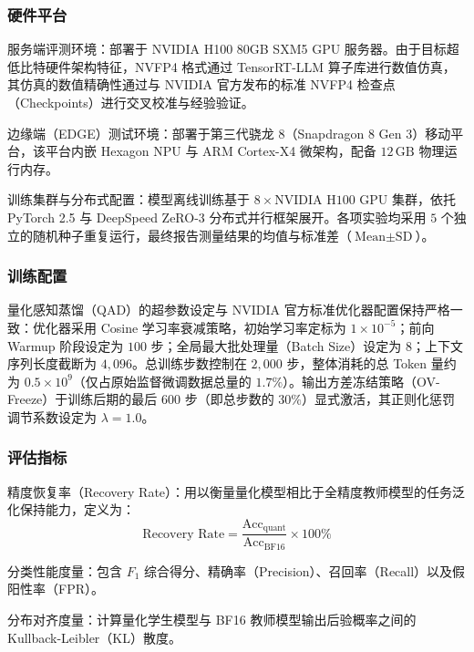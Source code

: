 \documentclass[11pt, a4paper]{article}
\begin{document}
\subsubsection{硬件平台}

{服务端评测环境}：部署于 NVIDIA H100 80GB SXM5 GPU 服务器。由于目标超低比特硬件架构特征，NVFP4 格式通过 TensorRT-LLM 算子库进行数值仿真，其仿真的数值精确性通过与 NVIDIA 官方发布的标准 NVFP4 检查点（Checkpoints）进行交叉校准与经验验证。
    
{边缘端（EDGE）测试环境}：部署于第三代骁龙 8（Snapdragon 8 Gen 3）移动平台，该平台内嵌 Hexagon NPU 与 ARM Cortex-X4 微架构，配备 $12\,\mathrm{GB}$ 物理运行内存。
    
{训练集群与分布式配置}：模型离线训练基于 $8 \times \text{NVIDIA H100}$ GPU 集群，依托 PyTorch 2.5 与 DeepSpeed ZeRO-3 分布式并行框架展开。各项实验均采用 $5$ 个独立的随机种子重复运行，最终报告测量结果的均值与标准差（$\text{Mean} \pm \text{SD}$）。


\subsubsection{训练配置}
量化感知蒸馏（QAD）的超参数设定与 NVIDIA 官方标准优化器配置保持严格一致：优化器采用 Cosine 学习率衰减策略，初始学习率定标为 $1 \times 10^{-5}$；前向 Warmup 阶段设定为 $100$ 步；全局最大批处理量（Batch Size）设定为 $8$；上下文序列长度截断为 $4,096$。总训练步数控制在 $2,000$ 步，整体消耗的总 Token 量约为 $0.5\times 10^9$（仅占原始监督微调数据总量的 $1.7\%$）。输出方差冻结策略（OV-Freeze）于训练后期的最后 $600$ 步（即总步数的 $30\%$）显式激活，其正则化惩罚调节系数设定为 $\lambda = 1.0$。

\subsubsection{评估指标}

   {精度恢复率（Recovery Rate）}：用以衡量量化模型相比于全精度教师模型的任务泛化保持能力，定义为：
    \begin{equation}
    \label{eq:recovery_rate}
        \text{Recovery Rate} = \frac{\text{Acc}_{\mathrm{quant}}}{\text{Acc}_{\mathrm{BF16}}} \times 100\%
    \end{equation}
    
    {分类性能度量}：包含 $F_1$ 综合得分、精确率（Precision）、召回率（Recall）以及假阳性率（FPR）。
    
    {分布对齐度量}：计算量化学生模型与 BF16 教师模型输出后验概率之间的 Kullback-Leibler（KL）散度。
    
\end{document}
